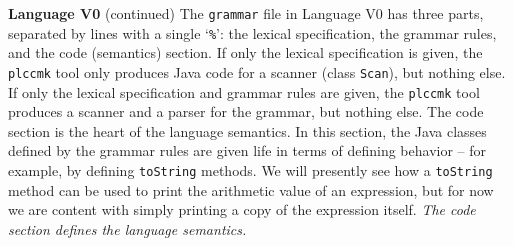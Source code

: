 \begin{minipage}[t]{\sw}
\slidenumber
\LARGE
{\bf Language V0} (continued)\exx
The \verb'grammar' file in Language V0
has three parts, separated by lines with a single `\verb'%'':
the lexical specification,
the grammar rules,
and the code (semantics) section.\exx
If only the lexical specification is given,
the \verb'plccmk' tool only produces Java code
for a scanner (class \verb'Scan'),
but nothing else.
If only the lexical specification and grammar rules are given,
the \verb'plccmk' tool
produces a scanner and a parser for the grammar,
but nothing else.\exx
The code section is the heart of the language semantics.
In this section, the Java classes defined by the grammar rules
are given life in terms of defining behavior --
for example, by defining \verb'toString' methods.
We will presently see how a \verb'toString' method can be used
to print the arithmetic value of an expression,
but for now we are content with simply printing
a copy of the expression itself.\exx
{\em The code section defines the language semantics.}
\end{minipage}
